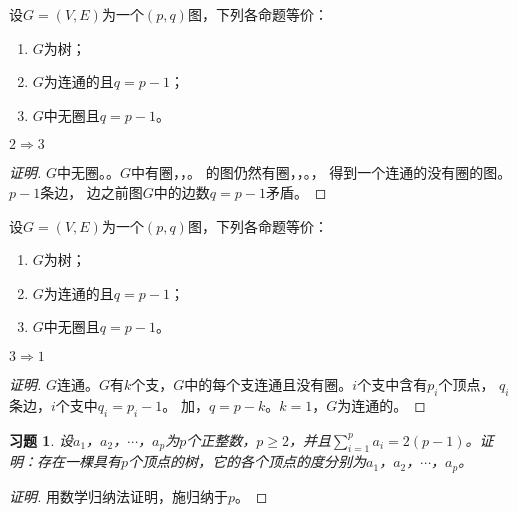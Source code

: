 \documentclass{beamer}
\newtheorem{Exercise}{习题}
\begin{document}
\begin{CJK*}{UTF8}{gbsn}
\begin{frame}
\end{frame}
\begin{frame}
  \begin{Thm1}
    设$G=(V,E)$为一个$(p,q)$图，下列各命题等价：
      \begin{enumerate}
      \item $G$为树；
      \item $G$为连通的且$q = p - 1$；
      \item $G$中无圈且$q = p - 1$。
      \end{enumerate}  
  \end{Thm1}
  $2\Rightarrow 3$
\pause\begin{proof}[证明]
$G$中无圈。。$G$中有圈，，。
的图仍然有圈，，。，
得到一个连通的没有圈的图。$p-1$条边，
边之前图$G$中的边数$q=p-1$矛盾。 
\end{proof}
  \end{frame}
\begin{frame}
  \begin{Thm1}
    设$G=(V,E)$为一个$(p,q)$图，下列各命题等价：
      \begin{enumerate}
      \item $G$为树；
      \item $G$为连通的且$q = p - 1$；
      \item $G$中无圈且$q = p - 1$。
      \end{enumerate}  
  \end{Thm1}
  $3\Rightarrow 1$
\pause\begin{proof}[证明]
  $G$连通。$G$有$k$个支，$G$中的每个支连通且没有圈。$i$个支中含有$p_i$个顶点，
\pause$q_i$条边，$i$个支中$q_i=p_i-1$。
加，$q = p-k$。$k=1$，$G$为连通的。
\end{proof}
\end{frame}
\begin{frame}
  \begin{Exercise}\small\justifying\let\raggedright\justifying
  设$a_1$，$a_2$，$\cdots$，$a_p$为$p$个正整数，$p\geq 2$，并且$\sum_{i=1}^pa_i=2(p-1)$。证明：存在一棵具有$p$个顶点的树，它的各个顶点的度分别为$a_1$，$a_2$，$\cdots$，$a_p$。
\end{Exercise}\pause
\begin{proof}[证明]\small\justifying\let\raggedright\justifying
  用数学归纳法证明，施归纳于$p$。\pause


\end{proof}
\end{frame}
\end{CJK*}
\end{document}
